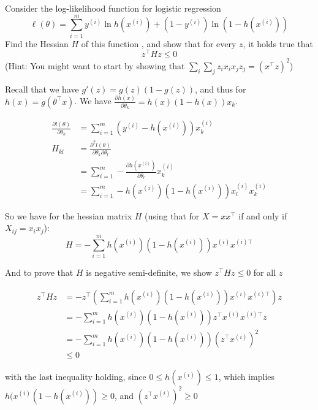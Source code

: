 Consider the log-likelihood function for logistic regression
\[\ell(\theta) = \sum^m_{i=1}y^{(i)}\ln h(x^{(i)}) + (1 - y^{(i)})\ln(1 - h(x^{(i)}))\]
Find the Hessian $H$ of this function , and show that for every $z$, it holds true that
\[z^{\top}Hz \leq 0\]
(Hint: You might want to start by showing that $\sum_i\sum_j z_i x_i x_j z_j = (x^{\top}z)^2$)

\begin{solution}
Recall that we have $g'(z) = g(z)(1-g(z))$, and thus for $h(x) = g(\theta^{\top}x)$. We have $\frac{\partial h(x)}{\partial \theta_k} = h(x)(1 - h(x))x_k$.

\[
\begin{split}
\frac{\partial l(\theta)}{\partial \theta_k} & = \sum^m_{i=1}(y^{(i)} - h(x^{(i)}))x_k^{(i)}\\
H_{kl} & = \frac{\partial^2 l(\theta)}{\partial \theta_k \partial \theta_l}\\
& = \sum^m_{i=1} - \frac{\partial h(x^{(i)})}{\partial \theta_l} x_k^{(i)}\\
& = \sum^m_{i=1} - h(x^{(i)})(1 - h(x^{(i)}) )x_l^{(i)}x_k^{(i)}
\end{split}\]

So we have for the hessian matrix $H$ (using that for $X = xx^{\top}$ if and only if $X_{ij} = x_ix_j$):
\[
H = - \sum^m_{i=1} h(x^{(i)})(1 - h(x^{(i)}) )x^{(i)}x^{(i)\top}
\]

And to prove that $H$ is negative semi-definite, we show $z^{\top}Hz \leq 0$ for all $z$

\[
\begin{split}
    z^{\top}Hz & = -z^{\top} (\sum^m_{i=1} h(x^{(i)}) (1 - h(x^{(i)}))x^{(i)}x^{(i)\top})z\\
    & = -\sum^m_{i=1} h(x^{(i)}) (1 - h(x^{(i)}))z^{\top}x^{(i)}x^{(i)\top}z\\
    & = -\sum^m_{i=1} h(x^{(i)}) (1 - h(x^{(i)}))(z^{\top}x^{(i)})^2\\
    & \leq 0
\end{split}
\]

with the last inequality holding, since $0 \leq h(x^{(i)}) \leq 1$, which implies $h(x^{(i)}(1 - h(x^{(i)})) \geq 0$, and $(z^{\top}x^{(i)})^2 \geq 0$
\end{solution}

\newpage